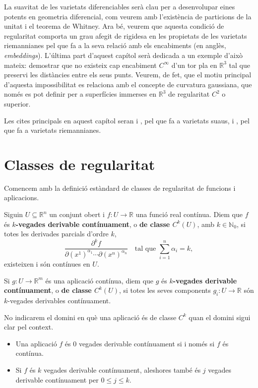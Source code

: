 La suavitat de les varietats diferenciables serà clau per a desenvolupar eines potents en geometria diferencial, com veurem amb l'existència de particions de la unitat i el teorema de Whitney. Ara bé, veurem que aquesta condició de regularitat comporta un grau afegit de rigidesa en les propietats de les varietats riemannianes pel que fa a la seva relació amb els encabiments (en anglès, \textit{embeddings}). L'última part d'aquest capítol serà dedicada a un exemple d'això mateix: demostrar que no existeix cap encabiment $C^\infty$ d'un tor pla en $\mathbb R^3$ tal que preservi les distàncies entre els seus punts. Veurem, de fet, que el motiu principal d'aquesta impossibilitat es relaciona amb el concepte de curvatura gaussiana, que només es pot definir per a superfícies immerses en $\mathbb R^3$ de regularitat $C^2$ o superior. 

Les cites principals en aquest capítol seran \citet{lee2013} i \citet{warner1983}, pel que fa a varietats suaus, i \citet{chavel2006}, pel que fa a varietats riemannianes.

\section{Classes de regularitat}
Comencem amb la definició estàndard de classes de regularitat de funcions i aplicacions.
\begin{defi}
    Siguin $U\subseteq\mathbb R^n$ un conjunt obert i $f:U\to\mathbb R$ una funció real contínua.
    Diem que $f$ és \textbf{ $k$-vegades derivable contínuament}, o \textbf{de classe $C^k(U)$}, amb $k\in\mathbb N_0$, si totes les derivades parcials d'ordre $k$, \begin{equation*}
        \frac{\partial^k f}{\partial (x^1)^{\alpha_1}\cdots\partial (x^n)^{\alpha_n}}\quad\text{tal que }\sum_{i=1}^n\alpha_i = k,
    \end{equation*} existeixen i són contínues en $U$.

    Si $g:U\to\mathbb R^m$ és una aplicació contínua, diem que $g$ és \textbf{ $k$-vegades derivable contínuament}, o \textbf{de classe $C^k(U)$}, si totes les seves components $g_i:U\to\mathbb R$ són $k$-vegades derivables contínuament.
\end{defi}
\begin{nota}
    No indicarem el domini en què una aplicació és de classe $C^k$ quan el domini sigui clar pel context.
\end{nota}

\begin{obss}
\end{obss}
\begin{itemize}
    \item Una aplicació $f$ és $0$ vegades derivable contínuament si i només si $f$ és contínua. 
    \item Si $f$ és $k$ vegades derivable contínuament, aleshores també és $j$ vegades derivable contínuament per $0\le j\le k$.
\end{itemize}

